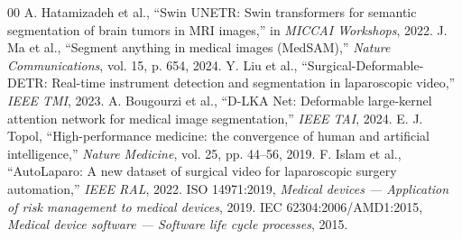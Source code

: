 \documentclass[conference]{IEEEtran}
\begin{document}
\begin{thebibliography}{00}
 A. Hatamizadeh et al., ``Swin UNETR: Swin transformers for semantic segmentation of brain tumors in MRI images,'' in \emph{MICCAI Workshops}, 2022.
 J. Ma et al., ``Segment anything in medical images (MedSAM),'' \emph{Nature Communications}, vol. 15, p. 654, 2024.
 Y. Liu et al., ``Surgical-Deformable-DETR: Real-time instrument detection and segmentation in laparoscopic video,'' \emph{IEEE TMI}, 2023.
 A. Bougourzi et al., ``D-LKA Net: Deformable large-kernel attention network for medical image segmentation,'' \emph{IEEE TAI}, 2024.
 E. J. Topol, ``High-performance medicine: the convergence of human and artificial intelligence,'' \emph{Nature Medicine}, vol. 25, pp. 44--56, 2019.
 F. Islam et al., ``AutoLaparo: A new dataset of surgical video for laparoscopic surgery automation,'' \emph{IEEE RAL}, 2022.
 ISO 14971:2019, \emph{Medical devices --- Application of risk management to medical devices}, 2019.
 IEC 62304:2006/AMD1:2015, \emph{Medical device software --- Software life cycle processes}, 2015.
\end{thebibliography}
\end{document}
